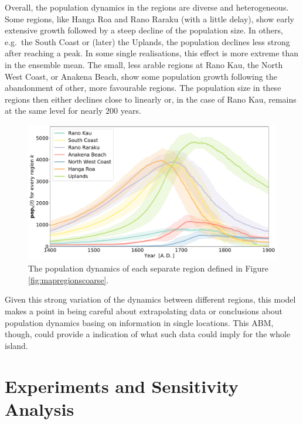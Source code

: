 Overall, the population dynamics in the regions are diverse and heterogeneous. 
Some regions, like Hanga Roa and Rano Raraku (with a little delay), show early extensive growth followed by a steep decline of the population size.
In others, e.g.\ the South Coast or (later) the Uplands, the population declines less strong after reaching a peak.
In some single realisations, this effect is more extreme than in the ensemble mean.
The small, less arable regions at Rano Kau, the North West Coast, or Anakena Beach, show some population growth following the abandonment of other, more favourable regions.
The population size in these regions then either declines close to linearly or, in the case of Rano Kau, remains at the same level for nearly $200$ years.
\begin{figure}
	\centering
	\includegraphics[width=1.0\linewidth]{images/Results/Standard/RegionalStatsEnsembleOnly}
	\caption{The population dynamics of each separate region defined in Figure \ref{fig:mapregionscoarse}.}
	\label{fig:regionalstats}
\end{figure}
Given this strong variation of the dynamics between different regions, this model makes a point in being careful about extrapolating data or conclusions about population dynamics basing on information in single locations.
This ABM, though, could provide a indication of what such data could imply for the whole island.

\FloatBarrier
\section{Experiments and Sensitivity Analysis}

